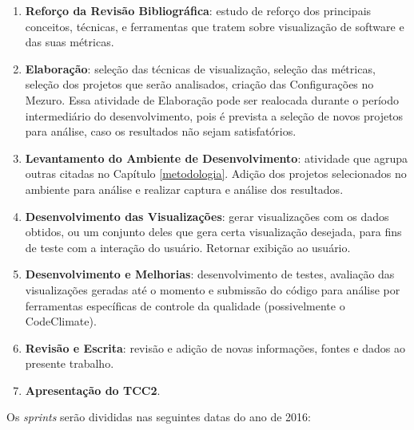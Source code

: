 \begin{enumerate}[label=(\alph*)]
\item \textbf{Reforço da Revisão Bibliográfica}: estudo de reforço dos
principais conceitos, técnicas, e ferramentas que tratem sobre visualização de
software e das suas métricas.
\item \textbf{Elaboração}: seleção das técnicas de visualização, seleção das
métricas, seleção dos projetos que serão analisados, criação das Configurações
no Mezuro. Essa atividade de Elaboração pode ser realocada durante o período
intermediário do desenvolvimento, pois é prevista a seleção de novos projetos
para análise, caso os resultados não sejam satisfatórios.
\item \textbf{Levantamento do Ambiente de Desenvolvimento}: atividade que
agrupa outras citadas no Capítulo \ref{metodologia}. Adição dos projetos
selecionados no ambiente para análise e realizar captura e análise dos
resultados.
\item \textbf{Desenvolvimento das Visualizações}: gerar visualizações com os
dados obtidos, ou um conjunto deles que gera certa visualização desejada, para
fins de teste com a interação do usuário. Retornar exibição ao usuário.
\item \textbf{Desenvolvimento e Melhorias}: desenvolvimento de testes, avaliação
das visualizações geradas até o momento e submissão do código para análise por
ferramentas específicas de controle da qualidade (possivelmente o
CodeClimate).
\item \textbf{Revisão e Escrita}: revisão e adição de novas informações, fontes
e dados ao presente trabalho.
\item \textbf{Apresentação do TCC2}.
\end{enumerate}

Os \textit{sprints} serão divididas nas seguintes datas do ano de 2016:

